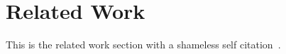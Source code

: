 \section{Related Work}
\label{sec:prior}

This is the related work section with a shameless self citation~\cite{Saito:2018:HSU}.
